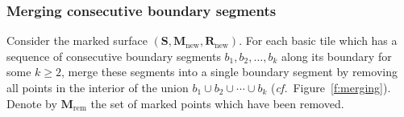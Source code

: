 \documentclass[a4paper,10pt]{amsart}
\theoremstyle{plain}          %
\theoremstyle{definition}
\def\SS{\mathbf{S}}
\def\RR{\mathbf{R}}
\def\MM{\mathbf{M}}
\def\MM{\mathbf{M}}
\newcommand{\confer}{{\em cf.}\ }
\begin{document}

\subsubsection{Merging consecutive boundary segments}


Consider the marked surface $(\SS,\MM_{\mathrm{new}},\RR_{\mathrm{new}})$.
For each basic tile  which has a sequence of consecutive boundary segments
$b_1,b_2,\dots,b_k$ along its boundary for some $k\ge 2$, merge these segments
into a single boundary segment by removing all points in the interior of the
union $b_1\cup b_2\cup\cdots\cup b_k$ (\confer Figure~\ref{f:merging}).
Denote by $\MM_{\mathrm{rem}}$ the set of marked points which have been removed.
\end{document}
